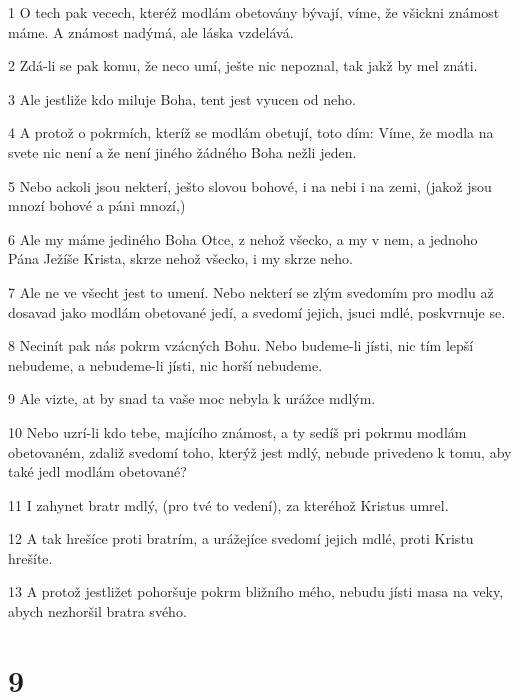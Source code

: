 \par 1 O tech pak vecech, kteréž modlám obetovány bývají, víme, že všickni známost máme. A známost nadýmá, ale láska vzdelává.
\par 2 Zdá-li se pak komu, že neco umí, ješte nic nepoznal, tak jakž by mel znáti.
\par 3 Ale jestliže kdo miluje Boha, tent jest vyucen od neho.
\par 4 A protož o pokrmích, kteríž se modlám obetují, toto dím: Víme, že modla na svete nic není a že není jiného žádného Boha nežli jeden.
\par 5 Nebo ackoli jsou nekterí, ješto slovou bohové, i na nebi i na zemi, (jakož jsou mnozí bohové a páni mnozí,)
\par 6 Ale my máme jediného Boha Otce, z nehož všecko, a my v nem, a jednoho Pána Ježíše Krista, skrze nehož všecko, i my skrze neho.
\par 7 Ale ne ve všecht jest to umení. Nebo nekterí se zlým svedomím pro modlu až dosavad jako modlám obetované jedí, a svedomí jejich, jsuci mdlé, poskvrnuje se.
\par 8 Necinít pak nás pokrm vzácných Bohu. Nebo budeme-li jísti, nic tím lepší nebudeme, a nebudeme-li jísti, nic horší nebudeme.
\par 9 Ale vizte, at by snad ta vaše moc nebyla k urážce mdlým.
\par 10 Nebo uzrí-li kdo tebe, majícího známost, a ty sedíš pri pokrmu modlám obetovaném, zdaliž svedomí toho, kterýž jest mdlý, nebude privedeno k tomu, aby také jedl modlám obetované?
\par 11 I zahynet bratr mdlý, (pro tvé to vedení), za kteréhož Kristus umrel.
\par 12 A tak hrešíce proti bratrím, a urážejíce svedomí jejich mdlé, proti Kristu hrešíte.
\par 13 A protož jestližet pohoršuje pokrm bližního mého, nebudu jísti masa na veky, abych nezhoršil bratra svého.

\chapter{9}

